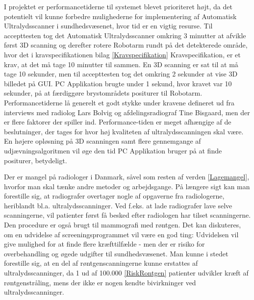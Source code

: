 I projektet er performancetiderne til systemet blevet prioriteret højt, da det potentielt vil kunne forbedre mulighederne for implementering af Automatisk Ultralydsscanner i sundhedsvæsenet, hvor tid er en vigtig resurse. Til accepttesten tog det Automatisk Ultralydsscanner omkring 3 minutter at afvikle først 3D scanning og derefter rotere Robotarm rundt på det detekterede område, hvor det i kravspecifikationen bilag \ref{Kravspecifikation} Kravspecifikation, er et krav, at det må tage 10 minutter til sammen. En 3D scanning er sat til at må tage 10 sekunder, men til accepttesten tog det omkring 2 sekunder at vise 3D billedet på GUI. PC Applikation brugte under 1 sekund, hvor kravet var 10 sekunder, på at færdiggøre brystområdets positurer til Robotarm. Performancetiderne lå generelt et godt stykke under kravene defineret ud fra interviews med radiolog Lars Bolvig og afdelingsradiograf Tine Bisgaard, men der er flere faktorer der spiller ind. Performance-tiden er meget afhængige af de beslutninger, der tages for hvor høj kvaliteten af ultralydsscanningen skal være. En højere opløsning på 3D scanningen samt flere gennemgange af udjævningsalgoritmen vil øge den tid PC Applikation bruger på at finde positurer, betydeligt.  

Der er mangel på radiologer i Danmark, såvel som resten af verden \ref{Lagemangel}, hvorfor man skal tænke andre metoder og arbejdsgange. På længere sigt kan man forestille sig, at radiografer overtager nogle af opgaverne fra radiologerne, heriblandt bl.a. ultralydsscanninger. Ved f.eks. at lade radiografer lave selve scanningerne, vil patienter først få besked efter radiologen har tilset scanningerne. Den procedure er også brugt til mammografi med røntgen. Det kan diskuteres, om en udvidelse af screeningsprogrammet vil være en god ting: Udvidelsen vil give mulighed for at finde flere kræfttilfælde - men der er risiko for overbehandling og øgede udgifter til sundhedsvæsenet. Man kunne i stedet forestille sig, at en del af røntgenscanningerne kunne erstattes af ultralydsscanninger, da 1 ud af 100.000 \ref{RiskRontgen} patienter udvikler kræft af røntgenstråling, mens der ikke er nogen kendte bivirkninger ved ultralydsscanninger.

